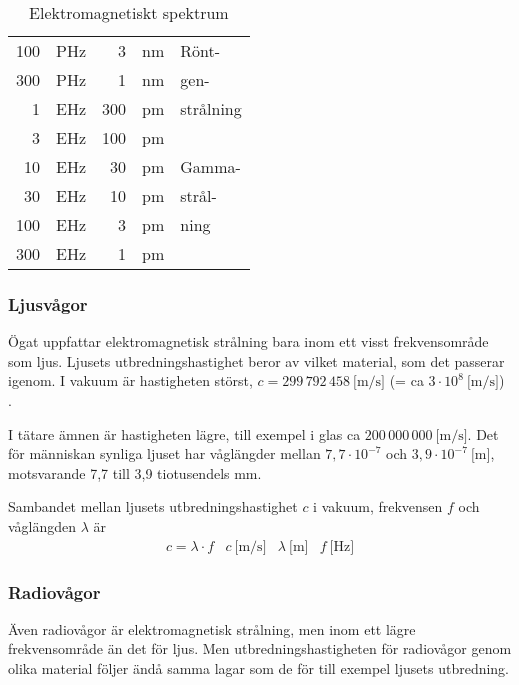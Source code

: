 \begin{table}
\begin{center}
\begin{tabular}{|rl|rl|l|}
100 & PHz &   3 & nm & Rönt-\\
300 & PHz &   1 & nm & gen-\\
  1 & EHz & 300 & pm & strålning\\ \cline{5-5}
  3 & EHz & 100 & pm & \\
 10 & EHz &  30 & pm & Gamma-\\
 30 & EHz &  10 & pm & strål-\\
100 & EHz &   3 & pm & ning\\
300 & EHz &   1 & pm & \\
\hline
\end{tabular}
\end{center}
\caption{Elektromagnetiskt spektrum}
\label{tab:elektromagnetiskt_spektrum}
\end{table}

\subsubsection{Ljusvågor}

Ögat uppfattar elektromagnetisk strålning bara inom ett visst frekvensområde
som ljus.
Ljusets utbredningshastighet beror av vilket material, som det passerar igenom.
I vakuum är hastigheten störst, \(c = 299\, 792\, 458\ \text{[m/s]}\)
(= ca \(3 \cdot 10^8\ \text{[m/s]}\)) \cite{SIbrochure8}.

I tätare ämnen är hastigheten lägre, till exempel i glas ca \(200\, 000\, 000\ \text{[m/s]}\).
Det för människan synliga ljuset har våglängder mellan \(7,7 \cdot 10^{-7}\)
och \(3,9 \cdot 10^{-7}\ \text{[m]}\), motsvarande 7,7 till 3,9 tiotusendels mm.

Sambandet mellan ljusets utbredningshastighet \(c\) i vakuum, frekvensen \(f\)
och våglängden \(\lambda\) är
\[
\begin{array}{llll}
c = \lambda \cdot f & c \ \text{[m/s]} & \lambda \ \text{[m]} & f \ \text{[Hz]}
\end{array}
\]
\subsubsection{Radiovågor}

Även radiovågor är elektromagnetisk strålning, men inom ett lägre
frekvensområde än det för ljus.
Men utbredningshastigheten för radiovågor genom olika material följer ändå
samma lagar som de för till exempel ljusets utbredning.


